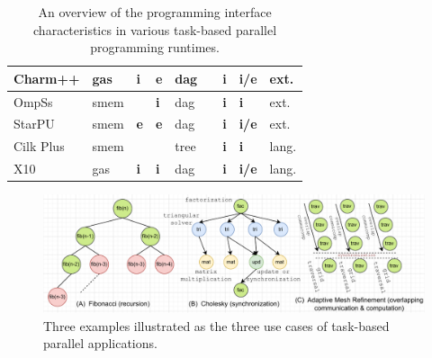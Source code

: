 \begin{table}[t]
{\begin{tabular}{|l|lll|ll|ll|l|}
	Charm++ \cite{acun2014parallel} & \multicolumn{1}{l|}{gas} & \multicolumn{1}{l|}{\textbf{i}} & \textbf{e} & \multicolumn{1}{l|}{dag} & \cmark & \multicolumn{1}{l|}{\textbf{i}} & \textbf{i/e} & ext. \\ \hline 
	OmpSs \cite{duran2011ompss} & \multicolumn{1}{l|}{smem} & \multicolumn{1}{l|}{\xmark} & \textbf{i} & \multicolumn{1}{l|}{dag} & \xmark & \multicolumn{1}{l|}{\textbf{i}} & \textbf{i} & ext. \\ \hline
	StarPU \cite{augonnet2011starpu} & \multicolumn{1}{l|}{smem} & \multicolumn{1}{l|}{\textbf{e}} & \textbf{e} & \multicolumn{1}{l|}{dag} & \cmark & \multicolumn{1}{l|}{\textbf{i}} & \textbf{i/e} & ext. \\ \hline
	Cilk Plus \cite{robison2012cilk} & \multicolumn{1}{l|}{smem} & \multicolumn{1}{l|}{\xmark} & \xmark & \multicolumn{1}{l|}{tree} & \xmark & \multicolumn{1}{l|}{\textbf{i}} & \textbf{i} & lang. \\ \hline
	X10 \cite{chrles2005x10} & \multicolumn{1}{l|}{gas} & \multicolumn{1}{l|}{\textbf{i}} & \textbf{i} & \multicolumn{1}{l|}{dag} & \cmark & \multicolumn{1}{l|}{\textbf{i}} & \textbf{i/e} & lang. \\ \hline
\end{tabular}}
\caption{An overview of the programming interface characteristics in various task-based parallel programming runtimes.}
\label{tab:taskbased-apis}
\end{table}


\clearpage


\begin{figure}[t]
	\centering
	\includegraphics[scale=0.725]{./pictures/preliminaries/preli_task-based_app_usecases.pdf}
	\caption{Three examples illustrated as the three use cases of task-based parallel applications.}
	\label{fig:preli_taskbased_apps}
\end{figure}

